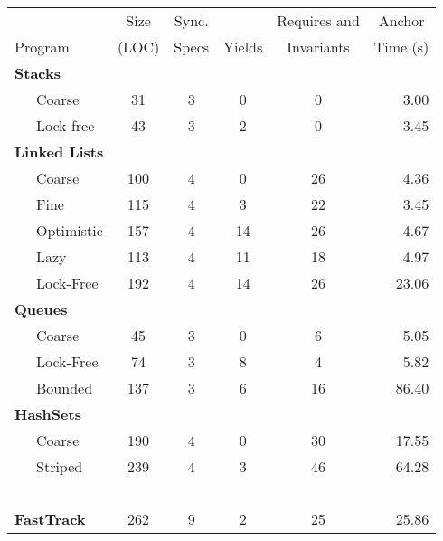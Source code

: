 \documentclass{article}
\begin{document}
       \begin{tabular}{llccccr}
       & & \multicolumn{1}{c}{Size}  & \multicolumn{1}{c}{Sync.} & & \multicolumn{1}{c}{Requires and}  & \multicolumn{1}{c}{Anchor}  \\
        \multicolumn{2}{l}{Program} & \multicolumn{1}{c}{(LOC)}  & \multicolumn{1}{c}{Specs} & \multicolumn{1}{c}{Yields} &  \multicolumn{1}{c}{Invariants} & \multicolumn{1}{c}{Time (s)} \\
        \toprule
      
\multicolumn{7}{l}{\bf Stacks}\\
 &  Coarse  &  31  &  3  &  0  &  0  &  3.00 \\   %
 &  Lock-free  &  43  &  3  &  2  &  0  &  3.45 \\   %
\multicolumn{7}{l}{\bf Linked Lists}\\
 &  Coarse  &  100  &  4  &  0  &  26  &  4.36 \\   %
 &  Fine  &  115  &  4  &  3  &  22  &  3.45 \\   %
 &  Optimistic  &  157  &  4  &  14  &  26  &  4.67 \\   %
 &  Lazy  &  113  &  4  &  11  &  18  &  4.97 \\   %
 &  Lock-Free  &  192  &  4  &  14  &  26  &  23.06 \\   %
\multicolumn{7}{l}{\bf Queues}\\
 &  Coarse  &  45  &  3  &  0  &  6  &  5.05 \\   %
 &  Lock-Free  &  74  &  3  &  8  &  4  &  5.82 \\   %
 &  Bounded  &  137  &  3  &  6  &  16  &  86.40 \\   %
\multicolumn{7}{l}{\bf HashSets}\\
 &  Coarse  &  190  &  4  &  0  &  30  &  17.55 \\   %
 &  Striped  &  239  &  4  &  3  &  46  &  64.28 \\   %
~\\[-1ex]
 \multicolumn{2}{l}{\bf FastTrack}  &  262  &  9  &  2  &  25  &  25.86 \\   %

\bottomrule
\end{tabular}
\end{document}
